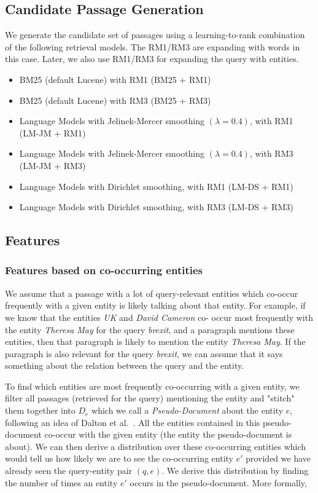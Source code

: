 \documentclass[sigconf,anonymous,review]{acmart}
\newcommand{\todo}[1]{ \PackageWarning{TODO:}{#1!}}
\begin{document}
\subsection{Candidate Passage Generation}
\label{subsec:candidate passage generation}
We generate the candidate set of passages using a learning-to-rank combination of the following retrieval models. The RM1/RM3 are expanding with words in this case. Later, we also use RM1/RM3 for expanding the query with entities. 
\begin{itemize}
    \item BM25 (default Lucene) with RM1 (BM25 + RM1)
    \item BM25 (default Lucene) with RM3 (BM25 + RM3)
    \item Language Models with Jelinek-Mercer smoothing $(\lambda = 0.4)$, with RM1 (LM-JM + RM1)
    \item Language Models with Jelinek-Mercer smoothing $(\lambda = 0.4)$, with RM3 (LM-JM + RM3)
    \item Language Models with Dirichlet smoothing, with RM1 (LM-DS + RM1)
    \item Language Models with Dirichlet smoothing, with RM3 (LM-DS + RM3)
\end{itemize}


\subsection{Features}
\label{subsec:features}
\subsubsection{Features based on co-occurring entities}
\label{subsubsec:features:1}
We assume that a passage with a lot of query-relevant entities which co-occur frequently with a given entity is likely talking about that entity. For example, if we know that the entities \textit{UK} and \textit{David Cameron} co- occur most frequently with the entity \textit{Theresa May} for the query \textit{brexit}, and a paragraph mentions these entities, then that paragraph is likely to mention the entity \textit{Theresa May}. If the paragraph is also relevant for the query \textit{brexit}, we can assume that it says something about the relation between the query and the entity. 

To find which entities are most frequently co-occurring with a given entity, we filter all passages (retrieved for the query) mentioning the entity and "stitch" them together into $D_e$ which we call a \textit{Pseudo-Document} about the entity $e$, following an idea of Dalton et al.\ \cite{dalton2014entity}. All the entities contained in this pseudo-document co-occur with the given entity (the entity the pseudo-document is about). We can then derive a distribution over these co-occurring entities which would tell us how likely we are to see the co-occurring entity $e'$ provided we have already seen the query-entity pair $(q, e)$. We derive this distribution by finding the number of times an entity $e'$ occurs in the pseudo-document. More formally, 
\end{document}
